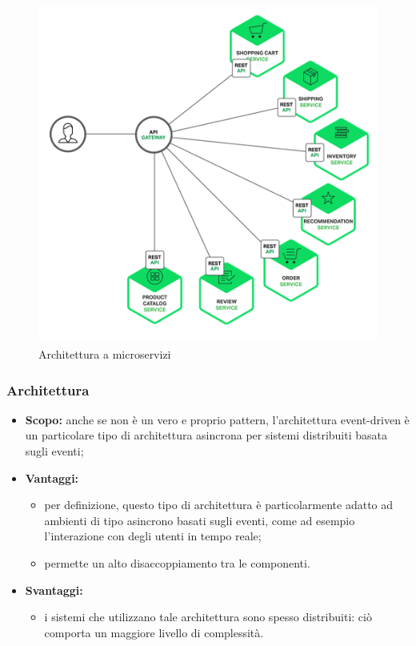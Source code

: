       \begin{figure}[h]
      	\centering
      	\includegraphics[width=\textwidth,height=\textheight,keepaspectratio,scale=0.1]{images/micros.png}
      	\caption{Architettura a microservizi}\label{fig:micr1}
      \end{figure}
      \newpage
    \subsubsection{Architettura }
      \begin{itemize}
       \item \textbf{Scopo:} anche se non è un vero e proprio pattern, l'architettura event-driven è un particolare tipo di architettura asincrona per sistemi distribuiti basata sugli eventi;
	\item \textbf{Vantaggi:}
	  \begin{itemize}
	   \item per definizione, questo tipo di architettura è particolarmente adatto ad ambienti di tipo asincrono basati sugli eventi, come ad esempio l'interazione con degli utenti in tempo reale;
	   \item permette un alto disaccoppiamento tra le componenti.
	  \end{itemize}
	\item \textbf{Svantaggi:}
	  \begin{itemize}
	   \item i sistemi che utilizzano tale architettura sono spesso distribuiti: ciò comporta un maggiore livello di complessità.
	  \end{itemize}
	\end{itemize}
